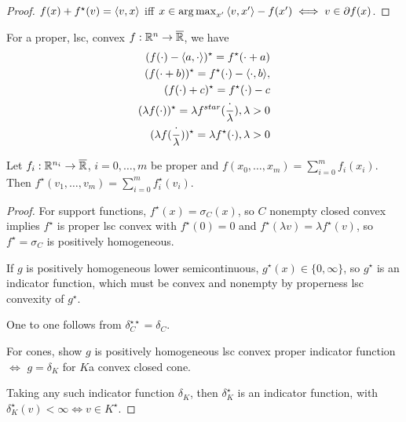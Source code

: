 \begin{proof}
  $f(x) + f^{\star}(v) = \IP{v, x}$ iff $x \in \argmax_{x'} \IP{v, x'}
  - f(x') \iff v \in \partial f(x)$.
\end{proof}

\begin{thm}
  \label{sec:conjugate-functions-10}
  For a proper, lsc, convex $f: \mathbb{R}^{n} \rightarrow \overline {\mathbb{R}}$, we
  have
  \begin{align}
    \label{eq:23}
    (f(\cdot) - \IP{a, \cdot})^{\star} = f^{\star}(\cdot + a) \\
    \label{eq:24}
    (f(\cdot + b))^{\star} = f^{\star}(\cdot) - \IP{\cdot, b}, \\
    \label{eq:25}
    (f(\cdot) + c)^{\star} = f^{\star}(\cdot) - c \\
    \label{eq:26}
    (\lambda f(\cdot))^{\star} = \lambda
    f^{star}(\frac{\cdot}{\lambda}), \lambda > 0 \\
    \label{eq:27}
    (\lambda f(\frac{\cdot}{\lambda} ))^{\star} = \lambda
    f^{\star}(\cdot), \lambda > 0
  \end{align}
\end{thm}

\begin{thm}
  \label{sec:conjugate-functions-11}
  Let $f_{i}: \mathbb{R}^{n_{i}} \rightarrow \overline {\mathbb{R}}$, $i = 0, \dots, m$
  be proper and $f(x_{0}, \dots, x_{m}) = \sum_{i=0}^{m}
  f_{i}(x_{i})$.  Then $f^{\star}(v_{1}, \dots, v_{m}) = \sum_{i=0}^{m} f^{\star}_{i}(v_{i})$.
\end{thm}

\begin{proof}
  For support functions, $f^{\star}(x) = \sigma_{C}(x)$, so $C$
  nonempty closed convex implies $f^{\star}$ is proper lsc convex with
  $f^{\star}(0) = 0$ and $f^{\star}(\lambda v) = \lambda
  f^{\star}(v)$, so $f^{\star} = \sigma_{C}$ is positively homogeneous.

  If $g$ is positively homogeneous lower semicontinuous, $g^{\star}(x)
  \in \{ 0, \infty \} $, so $g^{\star}$ is an indicator function,
  which must be convex and nonempty by properness lsc convexity of
  $g^{\star}$.

  One to one follows from $\delta^{\star \star}_{C} = \delta_{C}$.

  For cones, show $g$ is positively homogeneous lsc convex proper
  indicator function $\iff$ $g = \delta_{K}$ for $K$a convex closed
  cone.

  Taking any such indicator function $\delta_{K}$, then
  $\delta_{K}^{\star}$ is an indicator function, with
  $\delta_{K}^{\star}(v) < \infty \iff v \in K^{\star}$.
\end{proof}

